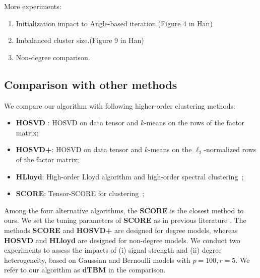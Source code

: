 \documentclass[lettersize,journal]{IEEEtran}
\theoremstyle{definition}
\theoremstyle{definition}
\begin{document}
{
\color{red} 
More experiments:
\begin{enumerate}
    \item Initialization impact to Angle-based iteration.(Figure 4 in Han)
    \item Imbalanced cluster size.(Figure 9 in Han)
    \item Non-degree comparison. 
\end{enumerate}
}

\subsection{Comparison with other methods}\label{subsec:comp}


We compare our algorithm with following higher-order clustering methods:
\begin{itemize}[wide,topsep=-3pt,itemsep=0pt,parsep=1pt]
    \item \textbf{\small HOSVD }: HOSVD on data tensor and $k$-means on the rows of the factor matrix;
    \item \textbf{\small HOSVD+}: HOSVD on data tensor and $k$-means on the $\ell_2$-normalized rows of the factor matrix;
    \item \textbf{\small HLloyd}: High-order Lloyd algorithm and high-order spectral clustering~\citep{han2020exact};
    \item \textbf{\small SCORE}: Tensor-SCORE for clustering~\citep{ke2019community};
\end{itemize}


 Among the four alternative algorithms, the \textbf{\small SCORE} is the closest method to ours.
We set the tuning parameters of \textbf{\small SCORE} as in previous literature \citep{ke2019community}. The methods \textbf{\small SCORE} and \textbf{\small HOSVD+} are designed for degree models, whereas \textbf{\small HOSVD} and \textbf{\small HLloyd} are designed for non-degree models.
We conduct two experiments to assess the impacts of (i) signal strength and (ii) degree heterogeneity, based on Gaussian and Bernoulli models with $ p = 100, r = 5$. We refer to our algorithm as \textbf{\small dTBM} in the comparison. 
\end{document}
